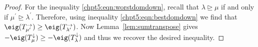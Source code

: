 \documentclass[11pt]{report}
\begin{document}
\begin{proof}
	
	
	
	
	
	
	For the inequality \eqref{chpt5:eqn:worstdomdown}, recall that $\lambda \trianglerighteq \mu$ if and only if $\mu^{\prime} \trianglerighteq \lambda^{\prime}$. 
	Therefore, using inequality \eqref{chpt5:eqn:bestdomdown} we find that $\eig(T_{\mu^{\prime}}^{\rightarrow}) \geq \eig(T_{\lambda^{\prime}}^{\rightarrow})$. 
	Now Lemma~\ref{lem:sumtranspose} gives $-\eig(T_{\mu}^{\downarrow}) 
	\geq -\eig(T_{\lambda}^{\downarrow})$ and thus we recover the desired 
	inequality.
	
	
	
	
	
	
	
	
	
	
	
	
	
	
	
	
	
	
	
	
	
	
	
	
	
	
	
	
	
	
	
	
	
	
	
	
	
	
	
	
	
\end{proof}
\end{document}
